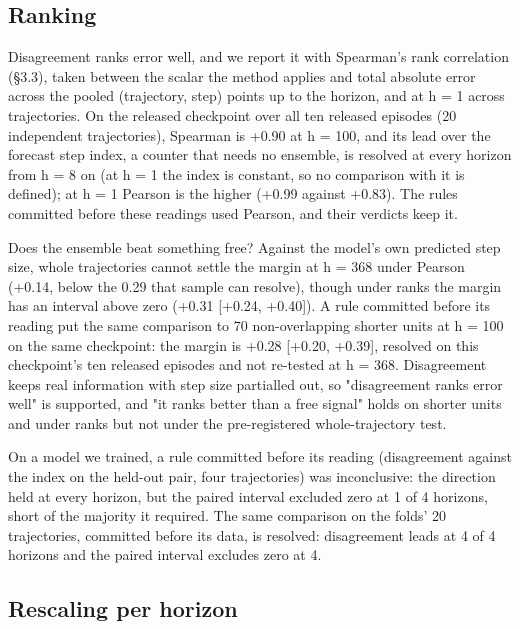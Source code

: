 \documentclass[10pt]{article}
\begin{document}
\subsection{Ranking}

Disagreement ranks error well, and we report it with Spearman's rank correlation (\S{}3.3), taken between the scalar the method applies and total absolute error across the pooled (trajectory, step) points up to the horizon, and at h = 1 across trajectories. On the released checkpoint over all ten released episodes (20 independent trajectories), Spearman is +0.90 at h = 100, and its lead over the forecast step index, a counter that needs no ensemble, is resolved at every horizon from h = 8 on (at h = 1 the index is constant, so no comparison with it is defined); at h = 1 Pearson is the higher (+0.99 against +0.83). The rules committed before these readings used Pearson, and their verdicts keep it.

Does the ensemble beat something free? Against the model's own predicted step size, whole trajectories cannot settle the margin at h = 368 under Pearson (+0.14, below the 0.29 that sample can resolve), though under ranks the margin has an interval above zero (+0.31 [+0.24, +0.40]). A rule committed before its reading put the same comparison to 70 non-overlapping shorter units at h = 100 on the same checkpoint: the margin is +0.28 [+0.20, +0.39], resolved on this checkpoint's ten released episodes and not re-tested at h = 368. Disagreement keeps real information with step size partialled out, so "disagreement ranks error well" is supported, and "it ranks better than a free signal" holds on shorter units and under ranks but not under the pre-registered whole-trajectory test.

On a model we trained, a rule committed before its reading (disagreement against the index on the held-out pair, four trajectories) was inconclusive: the direction held at every horizon, but the paired interval excluded zero at 1 of 4 horizons, short of the majority it required. The same comparison on the folds' 20 trajectories, committed before its data, is resolved: disagreement leads at 4 of 4 horizons and the paired interval excludes zero at 4.

\subsection{Rescaling per horizon}
\end{document}
